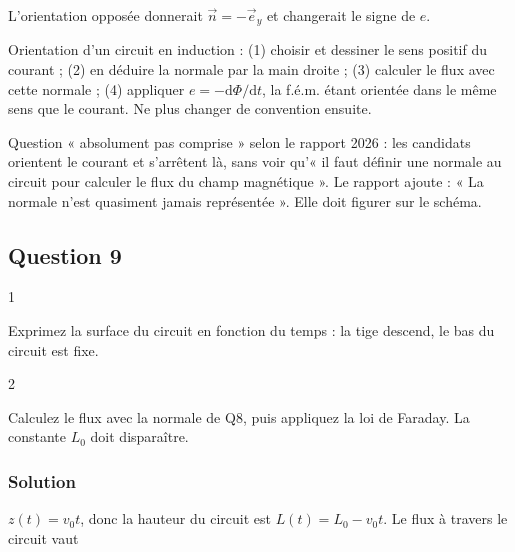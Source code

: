 \documentclass[11pt,a4paper]{article}
\newcommand{\equationajustee}[1]{%
  \sbox{\boiteequation}{$\displaystyle #1$}%
  \ifdim\wd\boiteequation>\linewidth
    \[\resizebox{\linewidth}{!}{\usebox{\boiteequation}}\]%
  \else
    \[#1\]%
  \fi}
\begin{document}
\equationajustee{\boxed{\vec n=+\vec e_y}}

L'orientation opposée donnerait \(\vec n=-\vec e_y\) et changerait le signe de \(e\).

\begin{methode}

Orientation d'un circuit en induction : (1) choisir et dessiner le sens positif du courant ; (2) en déduire la normale par la main droite ; (3) calculer le flux avec cette normale ; (4) appliquer \(e=-\mathrm{d}\Phi/\mathrm{d}t\), la f.é.m. étant orientée dans le même sens que le courant. Ne plus changer de convention ensuite.

\end{methode}

\begin{jury}

Question « absolument pas comprise » selon le rapport 2026 : les candidats orientent le courant et s'arrêtent là, sans voir qu'« il faut définir une normale au circuit pour calculer le flux du champ magnétique ». Le rapport ajoute : « La normale n'est quasiment jamais représentée ». Elle doit figurer sur le schéma.

\end{jury}

\hypertarget{question-9}{%
\subsection{Question 9}\label{question-9}}

\begin{indication}{1}

Exprimez la surface du circuit en fonction du temps : la tige descend, le bas du circuit est fixe.

\end{indication}

\begin{indication}{2}

Calculez le flux avec la normale de Q8, puis appliquez la loi de Faraday. La constante \(L_0\) doit disparaître.

\end{indication}

\hypertarget{solution-8}{%
\subsubsection{Solution}\label{solution-8}}

\(z(t)=v_0t\), donc la hauteur du circuit est \(L(t)=L_0-v_0t\). Le flux à travers le circuit vaut
\end{document}

